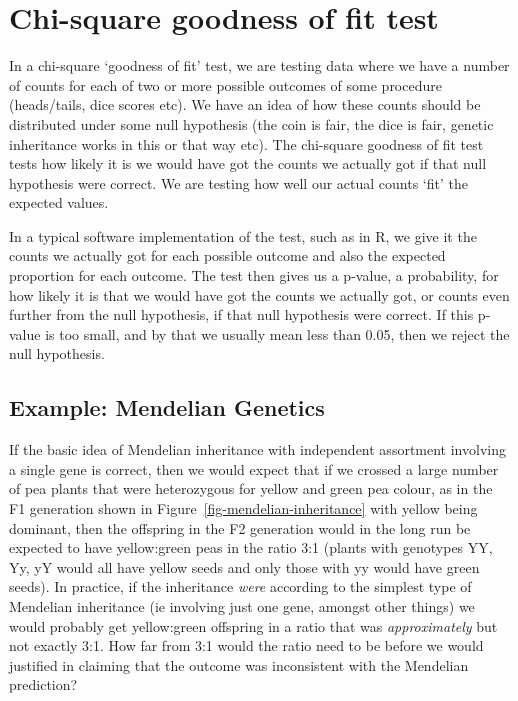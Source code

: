 \documentclass[
  letterpaper,
  DIV=11,
  numbers=noendperiod]{scrreprt}
\begin{document}
\section{Chi-square goodness of fit
test}\label{chi-square-goodness-of-fit-test}

In a chi-square `goodness of fit' test, we are testing data where we
have a number of counts for each of two or more possible outcomes of
some procedure (heads/tails, dice scores etc). We have an idea of how
these counts should be distributed under some null hypothesis (the coin
is fair, the dice is fair, genetic inheritance works in this or that way
etc). The chi-square goodness of fit test tests how likely it is we
would have got the counts we actually got if that null hypothesis were
correct. We are testing how well our actual counts `fit' the expected
values.

In a typical software implementation of the test, such as in R, we give
it the counts we actually got for each possible outcome and also the
expected proportion for each outcome. The test then gives us a p-value,
a probability, for how likely it is that we would have got the counts we
actually got, or counts even further from the null hypothesis, if that
null hypothesis were correct. If this p-value is too small, and by that
we usually mean less than 0.05, then we reject the null hypothesis.

\subsection{Example: Mendelian
Genetics}\label{example-mendelian-genetics}

If the basic idea of Mendelian inheritance with independent assortment
involving a single gene is correct, then we would expect that if we
crossed a large number of pea plants that were heterozygous for yellow
and green pea colour, as in the F1 generation shown in
Figure~\ref{fig-mendelian-inheritance} with yellow being dominant, then
the offspring in the F2 generation would in the long run be expected to
have yellow:green peas in the ratio 3:1 (plants with genotypes YY, Yy,
yY would all have yellow seeds and only those with yy would have green
seeds). In practice, if the inheritance \emph{were} according to the
simplest type of Mendelian inheritance (ie involving just one gene,
amongst other things) we would probably get yellow:green offspring in a
ratio that was \emph{approximately} but not exactly 3:1. How far from
3:1 would the ratio need to be before we would justified in claiming
that the outcome was inconsistent with the Mendelian prediction?
\end{document}
